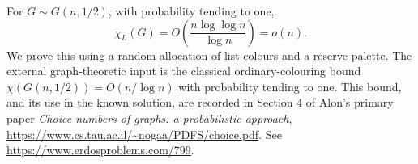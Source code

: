 For \(G\sim G(n,1/2)\), with probability tending to one,
\[
 \chi_L(G)=O\left(\frac{n\log\log n}{\log n}\right)=o(n).
\]
We prove this using a random allocation of list colours
and a reserve palette. The external graph-theoretic input
is the classical ordinary-colouring bound
\(\chi(G(n,1/2))=O(n/\log n)\) with probability tending to one.
This bound, and its use in the known solution, are recorded
in Section 4 of Alon's primary paper
\emph{Choice numbers of graphs: a probabilistic approach},
\url{https://www.cs.tau.ac.il/~nogaa/PDFS/choice.pdf}.
See \url{https://www.erdosproblems.com/799}.
